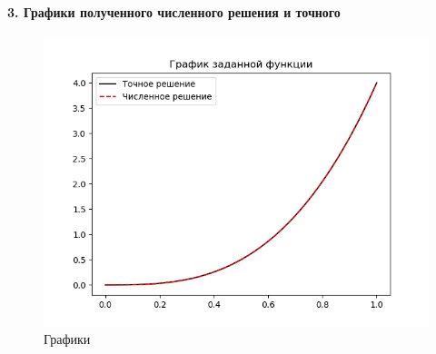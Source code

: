 \documentclass[11pt,a4paper]{report}
\begin{document}
\paragraph{3. Графики полученного численного решения и точного}
\begin{figure}[h!]
	\centering
	\includegraphics[width=\linewidth, keepaspectratio=true]{graphs.png}
	\caption{Графики}
	\label{fig:jobs}
\end{figure}
\end{document}
